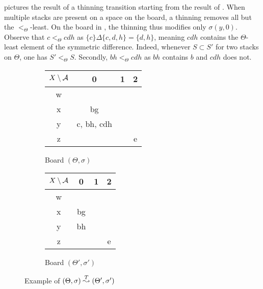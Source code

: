 \begin{example}\label{ex:thin}
   pictures the result of a thinning transition starting from the
  result of .
  When multiple stacks are present on a space on the board, a thinning removes
  all but the $<_\Theta$-least.
  On the board in , the thinning thus modifies only $\sigma(y, 0)$.
  Observe that $c <_\Theta cdh$ as $\{c\} \Delta \{c, d, h\} = \{d, h\}$, meaning $cdh$
  contains the $\Theta$-least element of the symmetric difference. Indeed,
  whenever $S \subset S'$ for two stacks on $\Theta$, one has $S' <_\Theta S$.
  Secondly, $bh <_\Theta cdh$ as $bh$ contains $b$ and $cdh$ does not.
  \begin{figure}[h]
    \centering
    
    \begin{subfigure}[b]{0.45\textwidth}
      \centering
      \begin{tabular}{|c|c|c|c|}
        \hline
        $X \setminus \mathcal{A}$& 0 & 1 & 2 \\
        \hline
        w & & & \\
        \hline
        x & bg & & \\
        \hline
        y & c, bh, cdh & & \\
        \hline
        z & & & e \\
        \hline
      \end{tabular}
      \caption{Board $(\Theta, \sigma)$}
      \label{fig:thin-a}
    \end{subfigure}
    \begin{subfigure}[b]{0.45\textwidth}
      \centering
      \begin{tabular}{|c|c|c|c|}
        \hline
        $X \setminus \mathcal{A}$& 0 & 1 & 2 \\
        \hline
        w & & & \\
        \hline
        x & bg & & \\
        \hline
        y & bh & & \\
        \hline
        z & & & e \\
        \hline
      \end{tabular}
      \caption{Board $(\Theta', \sigma')$}
      \label{fig:thin-b}
    \end{subfigure}
    \caption{Example of $(\Theta, \sigma) \stackrel{T}{\leadsto} (\Theta', \sigma')$}
    \label{fig:thin}
  \end{figure}
\end{example}

